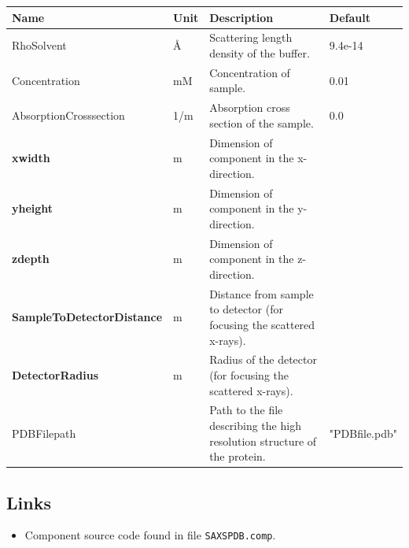 \begin{longtable}{p{}p{}p{}p{}}
\toprule
\textbf{Name} & \textbf{Unit} & \textbf{Description} & \textbf{Default} \\
\midrule
\endhead
RhoSolvent & \AA{} & Scattering length density of the buffer. & 9.4e-14 \\
Concentration & mM & Concentration of sample. & 0.01 \\
AbsorptionCrosssection & 1/m & Absorption cross section of the sample. & 0.0 \\
\textbf{xwidth} & m & Dimension of component in the x-direction. &  \\
\textbf{yheight} & m & Dimension of component in the y-direction. &  \\
\textbf{zdepth} & m & Dimension of component in the z-direction. &  \\
\textbf{SampleToDetectorDistance} & m & Distance from sample to detector (for focusing the scattered x-rays). &  \\
\textbf{DetectorRadius} & m & Radius of the detector (for focusing the scattered x-rays). &  \\
PDBFilepath &  & Path to the file describing the high resolution structure of the protein. & "PDBfile.pdb" \\
\bottomrule
\end{longtable}

\subsection*{Links}
\begin{itemize}
  \item Component source code found in file \texttt{SAXSPDB.comp}.
\end{itemize}
